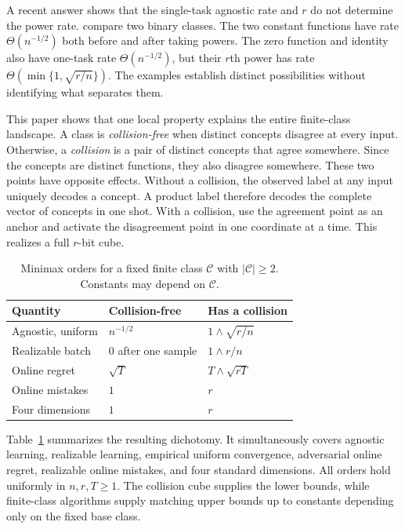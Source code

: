 \documentclass[twoside]{article}
\newcommand{\C}{\mathcal C}
\begin{document}
A recent answer shows that the single-task agnostic rate and $r$ do not determine the power rate. \citet{more2026} compare two binary classes. The two constant functions have rate $\Theta(n^{-1/2})$ both before and after taking powers. The zero function and identity also have one-task rate $\Theta(n^{-1/2})$, but their $r$th power has rate $\Theta(\min\{1,\sqrt{r/n}\})$. The examples establish distinct possibilities without identifying what separates them.

This paper shows that one local property explains the entire finite-class landscape. A class is \emph{collision-free} when distinct concepts disagree at every input. Otherwise, a \emph{collision} is a pair of distinct concepts that agree somewhere. Since the concepts are distinct functions, they also disagree somewhere. These two points have opposite effects. Without a collision, the observed label at any input uniquely decodes a concept. A product label therefore decodes the complete vector of concepts in one shot. With a collision, use the agreement point as an anchor and activate the disagreement point in one coordinate at a time. This realizes a full $r$-bit cube.

\begin{table}[t]
\caption{Minimax orders for a fixed finite class $\C$ with $|\C|\geq2$. Constants may depend on $\C$.}
\label{tab:dichotomy}
\centering
\small
\setlength{\tabcolsep}{3.2pt}
\begin{tabular}{p{}p{}p{}}
\toprule
Quantity & Collision-free & Has a collision \\
\midrule
Agnostic, uniform & $n^{-1/2}$ & $1\wedge\sqrt{r/n}$ \\
Realizable batch & $0$ after one sample & $1\wedge r/n$ \\
Online regret & $\sqrt T$ & $T\wedge\sqrt{rT}$ \\
Online mistakes & $1$ & $r$ \\
Four dimensions & $1$ & $r$ \\
\bottomrule
\end{tabular}
\end{table}

Table~\ref{tab:dichotomy} summarizes the resulting dichotomy. It simultaneously covers agnostic learning, realizable learning, empirical uniform convergence, adversarial online regret, realizable online mistakes, and four standard dimensions. All orders hold uniformly in $n,r,T\geq1$. The collision cube supplies the lower bounds, while finite-class algorithms supply matching upper bounds up to constants depending only on the fixed base class.
\end{document}
